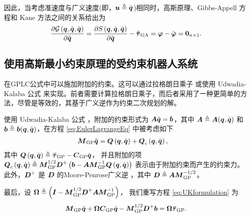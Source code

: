 因此，当考虑准速度与广义速度(即，$\boldsymbol{u}\triangleq\dot{\boldsymbol{q}}$)相同时，高斯原理、Gibbs-Appell 方程和 Kane 方法之间的关系给出为
\begin{equation}
\frac{\partial\mathcal{G}\left(\boldsymbol{q},\dot{\boldsymbol{q}},\ddot{\boldsymbol{q}}\right)}{\partial\ddot{\boldsymbol{q}}}=\frac{\partial S\left(\boldsymbol{q},\dot{\boldsymbol{q}},\ddot{\boldsymbol{q}}\right)}{\partial\ddot{\boldsymbol{q}}}-\boldsymbol{\bar{\tau}}_{\mathrm{GA}}=\boldsymbol{\varphi}-\bar{\boldsymbol{\varphi}}=\boldsymbol{0}_{n\times1}.\label{eq:EquivalenceGibbsGauss}
\end{equation}


\subsection{\normalfont\bfseries 使用高斯最小约束原理的受约束机器人系统\label{subsec:Constrained-Robotic-Systems}}

在GPLC公式中可以施加附加的约束。这可以通过拉格朗日乘子 \cite{Bouyarmane2012} 或使用 Udwadia-Kalaba 公式 \cite{FirdausE.UdwadiaandRobertE.Kalaba1992} 来实现。前者需要计算拉格朗日乘子，而后者采用了一种更简单的方法，尽管是等效的，其基于广义逆作为约束二次规划的解。

使用 Udwadia-Kalaba 公式 \cite{FirdausE.UdwadiaandRobertE.Kalaba1992}，附加的约束形式为 $\boldsymbol{A}\ddot{\boldsymbol{q}}=\boldsymbol{b}$，其中 $\boldsymbol{A}\triangleq\boldsymbol{A}(\boldsymbol{q},\dot{\boldsymbol{q}})$ 和 $\boldsymbol{b}\triangleq\boldsymbol{b}(\boldsymbol{q},\dot{\boldsymbol{q}})$，在方程 \eqref{eq:EulerLagrangeEq} 中被考虑如下
\begin{align}
\boldsymbol{M}_{\textrm{GP}}\ddot{\boldsymbol{q}} & =\boldsymbol{Q}\left(\boldsymbol{q},\dot{\boldsymbol{q}}\right)+\text{\ensuremath{\boldsymbol{Q}}}_{c}\left(\boldsymbol{q},\dot{\boldsymbol{q}}\right),\label{eq:UKformulation}
\end{align}
其中 $\boldsymbol{Q}\left(\boldsymbol{q},\dot{\boldsymbol{q}}\right)\triangleq\boldsymbol{\bar{\tau}}_{\mathrm{GP}}-\boldsymbol{C}_{\text{GP}}\dot{\boldsymbol{q}}$，
并且附加的项 $\text{\ensuremath{\boldsymbol{Q}}}_{c}\left(\boldsymbol{q},\dot{\boldsymbol{q}}\right)\triangleq\boldsymbol{M}_{\textrm{GP}}^{1/2}\boldsymbol{D}^{+}\left(\boldsymbol{b}-\boldsymbol{A}\boldsymbol{M}_{\textrm{GP}}^{-1}\boldsymbol{Q}\left(\boldsymbol{q},\dot{\boldsymbol{q}}\right)\right)$
表示由于附加约束而产生的约束力。
此外，$\boldsymbol{D}^{+}$ 是 $\boldsymbol{D}$ 的Moore-Penrose广义逆 \cite{spong2006robot}，其中 $\boldsymbol{D}\triangleq\boldsymbol{A}\boldsymbol{M}_{\textrm{GP}}^{-1/2}$。

最后，设 $\boldsymbol{\Omega}\triangleq\left(\boldsymbol{I}-\boldsymbol{M}_{\textrm{GP}}^{1/2}\boldsymbol{D}^{+}\boldsymbol{A}\boldsymbol{M}_{\textrm{GP}}^{-1}\right)$，
我们重写方程 \eqref{eq:UKformulation} 为
\begin{equation}
\boldsymbol{M}_{\textrm{GP}}\ddot{\boldsymbol{q}}+\boldsymbol{\Omega}\boldsymbol{C}_{\textrm{GP}}\dot{\boldsymbol{q}}-\boldsymbol{M}_{\textrm{GP}}^{1/2}\boldsymbol{D}^{+}\boldsymbol{b}=\boldsymbol{\Omega}\boldsymbol{\bar{\tau}}_{\mathrm{GP}}.\label{eq:FinalGaussUK}
\end{equation}

